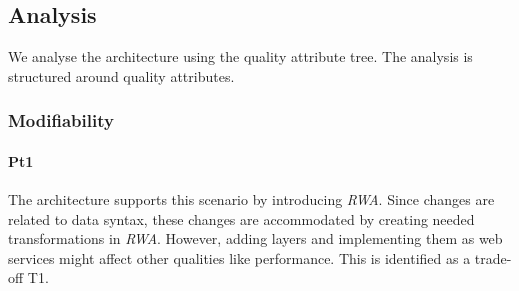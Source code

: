 \documentclass{llncs}
\begin{document}

 \subsection{Analysis}
 \label{sec:architecture-analysis}
We analyse the architecture using the quality attribute tree. The analysis is structured around quality attributes. %
\subsubsection{Modifiability}
\paragraph{Pt1} The architecture supports this scenario by introducing \emph{RWA}. Since changes are related to data syntax, these changes are accommodated by creating needed transformations in \emph{RWA}. However, adding layers and implementing them as web services might affect other qualities like performance. This is identified as a trade-off T1.
\end{document}
